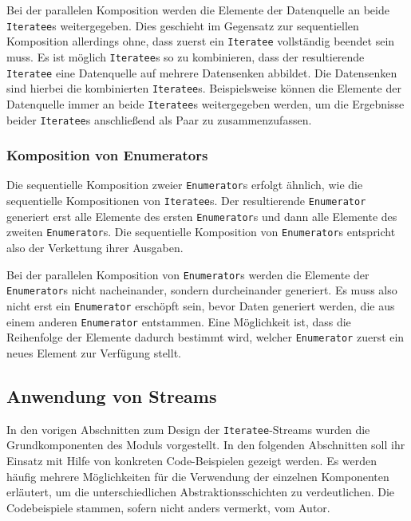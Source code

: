 Bei der parallelen Komposition werden die Elemente der Datenquelle an beide \lstinline|Iteratee|s weitergegeben.
Dies geschieht im Gegensatz zur sequentiellen Komposition allerdings ohne, dass zuerst ein \lstinline|Iteratee| vollständig beendet sein muss.
Es ist möglich \lstinline|Iteratee|s so zu kombinieren, dass der resultierende \lstinline|Iteratee| eine Datenquelle auf mehrere Datensenken abbildet.
Die Datensenken sind hierbei die kombinierten \lstinline|Iteratee|s.
Beispielsweise können die Elemente der Datenquelle immer an beide \lstinline|Iteratee|s weitergegeben werden, um die Ergebnisse beider \lstinline|Iteratee|s anschließend als Paar zu zusammenzufassen. %


\subsubsection{Komposition von Enumerators} %
\label{ssub:komposition_von_enumerators}

Die sequentielle Komposition zweier \lstinline|Enumerator|s erfolgt ähnlich, wie die sequentielle Kompositionen von \lstinline|Iteratee|s.
Der resultierende \lstinline|Enumerator| generiert erst alle Elemente des ersten \lstinline|Enumerator|s und dann alle Elemente des zweiten \lstinline|Enumerator|s.
Die sequentielle Komposition von \lstinline|Enumerator|s entspricht also der Verkettung ihrer Ausgaben. %

Bei der parallelen Komposition von \lstinline|Enumerator|s werden die Elemente der \lstinline|Enumerator|s nicht nacheinander, sondern durcheinander generiert.
Es muss also nicht erst ein \lstinline|Enumerator| erschöpft sein, bevor Daten generiert werden, die aus einem anderen \lstinline|Enumerator| entstammen.
Eine Möglichkeit ist, dass die Reihenfolge der Elemente dadurch bestimmt wird, welcher \lstinline|Enumerator| zuerst ein neues Element zur Verfügung stellt. %




\subsection{Anwendung von Streams} %
\label{sub:anwendung}

In den vorigen Abschnitten zum Design der \lstinline|Iteratee|-Streams wurden die Grundkomponenten des Moduls vorgestellt.
In den folgenden Abschnitten soll ihr Einsatz mit Hilfe von konkreten Code-Beispielen gezeigt werden.
Es werden häufig mehrere Möglichkeiten für die Verwendung der einzelnen Komponenten erläutert, um die unterschiedlichen Abstraktionsschichten zu verdeutlichen.
Die Codebeispiele stammen, sofern nicht anders vermerkt, vom Autor.

